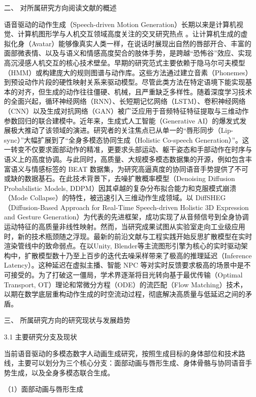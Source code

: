 \documentclass[UTF8]{ctexart}
\begin{document}
二、 对所属研究方向阅读文献的概述

语音驱动的动作生成（Speech-driven Motion
Generation）长期以来是计算机视觉、计算机图形学与人机交互领域高度关注的交叉研究热点
。让计算机生成的虚拟化身（Avatar）能够像真实人类一样，在说话时展现出自然的唇部开合、丰富的面部微表情、以及与语义和情感高度契合的肢体手势，是跨越``恐怖谷''效应、实现高沉浸感人机交互的核心技术壁垒。早期的研究范式主要依赖于隐马尔可夫模型（HMM）或构建庞大的规则图谱与动作库。这些方法通过建立音素（Phonemes）到预设动作片段的硬性映射关系来驱动模型。尽管此类方法在特定语境下能实现基本的对齐，但生成的动作往往僵硬、机械，且严重缺乏多样性。随着深度学习技术的全面兴起，循环神经网络（RNN）、长短期记忆网络（LSTM）、卷积神经网络（CNN）以及生成对抗网络（GAN）被广泛应用于音频特征特征提取与三维动作参数回归的联合建模中。近年来，生成式人工智能（Generative
AI）的爆发式发展极大推动了该领域的演进。研究者的关注焦点已从单一的``唇形同步（Lip-sync）''大幅扩展到了``全身多模态协同生成（Holistic
Co-speech
Generation）''。这一转变不仅要求面部动作的精准，更要求头部运动、躯干姿态和手部动作在时序与语义上的高度协调。与此同时，高质量、大规模多模态数据集的开源，例如包含丰富语义与情感标签的
BEAT
数据集，为研究高逼真度的协同语音手势提供了不可或缺的数据基石。在此技术背景下，去噪扩散概率模型（Denoising
Diffusion Probabilistic Models,
DDPM）因其卓越的复杂分布拟合能力和克服模式崩溃（Mode
Collapse）的特性，被迅速引入三维动作生成领域。以
DiffSHEG（Diffusion-Based Approach for Real-Time Speech-driven Holistic
3D Expression and Gesture
Generation）为代表的先进框架，成功实现了从音频信号到全身协调运动特征的高质量非线性映射。然而，当研究成果试图从实验室走向工业级应用时，新的技术瓶颈随之浮现。最新的前沿文献与工程实践开始反思扩散模型在实时渲染管线中的致命弱点。在以Unity,
Blender等主流图形引擎为核心的实时驱动架构中，扩散模型数十乃至上百步的迭代去噪采样带来了极高的推理延迟（Inference
Latency）。这种延迟在虚拟主播、智能 NPC
等对实时反馈要求极高的场景中是不可接受的。为了打破这一僵局，学术界逐渐将目光转向基于最优传输（Optimal
Transport, OT）理论和常微分方程（ODE）的流匹配（Flow
Matching）技术，以期在数学底层重构动作生成的时空流动过程，彻底解决高质量与低延迟之间的矛盾。

三、 所属研究方向的研究现状与发展趋势

3.1 主要研究分支及现状

当前语音驱动的多模态数字人动画生成研究，按照生成目标的身体部位和技术路线，主要可以划分为三个核心分支：面部动画与唇形生成、身体骨骼与协同语音手势生成，以及全身多模态联合生成。

（1）面部动画与唇形生成
\end{document}
